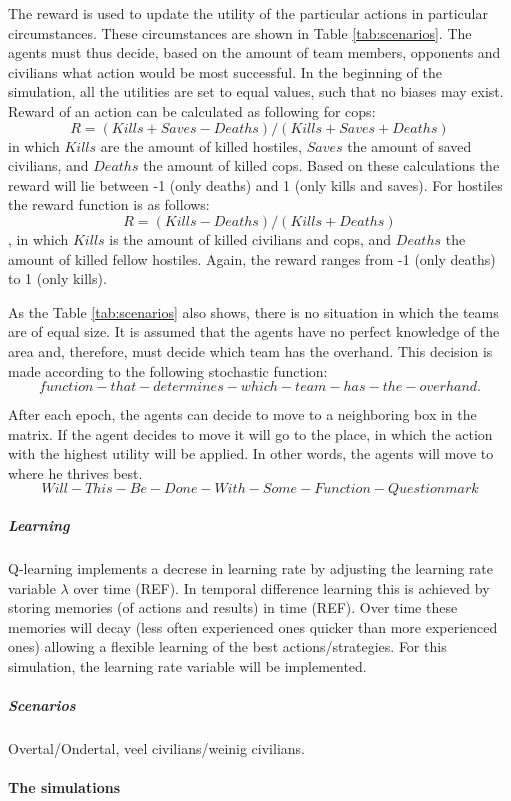 The reward is used to update the utility of the particular actions in particular circumstances. These circumstances are shown in Table \ref{tab:scenarios}. The agents must thus decide, based on the amount of team members, opponents and civilians what action would be most successful. In the beginning of the simulation, all the utilities are set to equal values, such that no biases may exist. Reward of an action can be calculated as following for cops: 
$$ R = (Kills + Saves - Deaths)/(Kills + Saves + Deaths)$$
in which $Kills$ are the amount of killed hostiles, $Saves$ the amount of saved civilians, and $Deaths$ the amount of killed cops. Based on these calculations the reward will lie between -1 (only deaths) and 1 (only kills and saves). For hostiles the reward function is as follows:
$$ R = (Kills - Deaths)/(Kills + Deaths)$$
, in which $Kills$ is the amount of killed civilians and cops, and $Deaths$ the amount of killed fellow hostiles. Again, the reward ranges from -1 (only deaths) to 1 (only kills). 

As the Table \ref{tab:scenarios} also shows, there is no situation in which the teams are of equal size. It is assumed that the agents have no perfect knowledge of the area and, therefore, must decide which team has the overhand. This decision is made according to the following stochastic function:
$$ function-that-determines-which-team-has-the-overhand. $$

After each epoch, the agents can decide to move to a neighboring box in the matrix. If the agent decides to move it will go to the place, in which the action with the highest utility will be applied. In other words, the agents will move to where he thrives best. 
$$ Will-This-Be-Done-With-Some-Function-Questionmark$$

\subparagraph{Learning}



Q-learning implements a decrese in learning rate by adjusting the learning rate variable $\lambda$ over time (REF). In temporal difference learning this is achieved by storing memories (of actions and results) in time (REF). Over time these memories will decay (less often experienced ones quicker than more experienced ones) allowing a flexible learning of the best actions/strategies. For this simulation, the learning rate variable will be implemented. 

\subparagraph{Scenarios}
Overtal/Ondertal, veel civilians/weinig civilians. 

\paragraph{The simulations}
